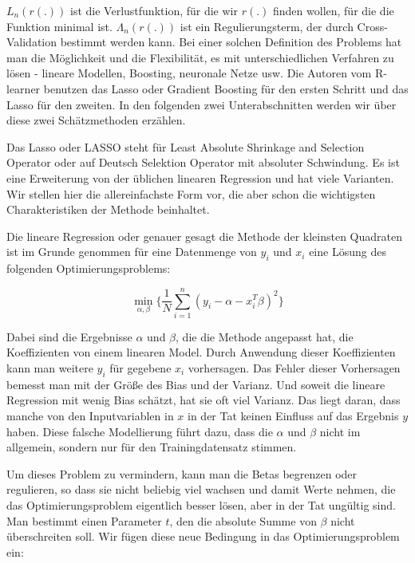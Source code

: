 \documentclass[12pt,a4paper,twoside]{scrartcl}
\numberwithin{equation}{section}
\newcounter{subsubsubsection}[subsubsection]
\begin{document}
\noindent
$L_n(r(.))$ ist die Verlustfunktion, für die wir $r(.)$ finden wollen, für die die Funktion minimal ist. $\Lambda_n(r(.))$ ist ein Regulierungsterm, der durch Cross-Validation bestimmt werden kann. Bei einer solchen Definition des Problems hat man die Möglichkeit und die Flexibilität, es mit unterschiedlichen Verfahren zu lösen - lineare Modellen, Boosting, neuronale Netze usw. Die Autoren vom R-learner benutzen das Lasso oder Gradient Boosting für den ersten Schritt und das Lasso für den zweiten. In den folgenden zwei Unterabschnitten werden wir über diese zwei Schätzmethoden erzählen.\par

\label{subsubsubsec:lasso}
	Das Lasso oder LASSO steht für Least Absolute Shrinkage and Selection Operator oder auf Deutsch Selektion Operator mit absoluter Schwindung. Es ist eine Erweiterung von der üblichen linearen Regression und hat viele Varianten. Wir stellen hier die allereinfachste Form vor, die aber schon die wichtigsten Charakteristiken der Methode beinhaltet.\par 
	
\noindent
Die lineare Regression oder genauer gesagt die Methode der kleinsten Quadraten ist im Grunde genommen für eine Datenmenge von  $y_i$ und $x_i$ eine Lösung des folgenden Optimierungsproblems:\par	

\begin{equation}\label{eq:2.22}
	 \min_{\alpha, \beta} \bigg\{ \frac{1}{N}\sum_{i=1}^{n} (y_i - \alpha - x_i^T\beta)^2 \bigg\}
\end{equation}

\noindent
Dabei sind die Ergebnisse $\alpha$ und $\beta$, die die Methode angepasst hat, die Koeffizienten von einem linearen Model. Durch Anwendung dieser Koeffizienten kann man weitere $y_i$ für gegebene $x_i$ vorhersagen. Das Fehler dieser Vorhersagen bemesst man mit der Größe des Bias und der Varianz. Und soweit die lineare Regression mit wenig Bias schätzt, hat sie oft viel Varianz. Das liegt daran, dass manche von den Inputvariablen in $x$ in der Tat keinen Einfluss auf das Ergebnis $y$ haben. Diese falsche Modellierung führt dazu, dass die $\alpha$ und $\beta$ nicht im allgemein, sondern nur für den Trainingdatensatz stimmen.\par 

\noindent
Um dieses Problem zu vermindern, kann man die Betas begrenzen oder regulieren, so dass sie nicht beliebig viel wachsen und damit Werte nehmen, die das Optimierungsproblem eigentlich besser lösen, aber in der Tat ungültig sind. Man bestimmt einen Parameter $t$, den die absolute Summe von $\beta$ nicht überschreiten soll\cite{tibshirani1996regression}. Wir fügen diese neue Bedingung in das Optimierungsproblem ein:\par   
\end{document}
